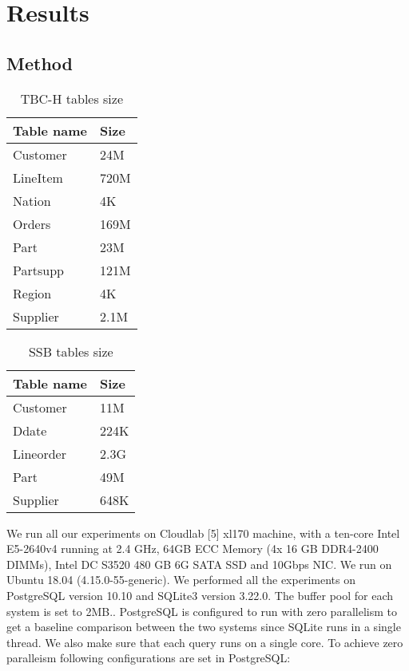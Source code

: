 \section{Results}
\label{sec:results}

\subsection{Method}

\begin{table}[]
\begin{tabular}{|l|l|}
\hline
\textbf{Table name} & \textbf{Size} \\ \hline
Customer & 24M \\ \hline
LineItem & 720M \\ \hline
Nation & 4K \\ \hline
Orders & 169M \\ \hline
Part & 23M \\ \hline
Partsupp & 121M \\ \hline
Region & 4K \\ \hline
Supplier & 2.1M \\ \hline
\end{tabular}
\caption{TBC-H tables size}
\label{tab:tbch_tab}
\end{table}

\begin{table}[]
\begin{tabular}{|l|l|}
\hline
\textbf{Table name} & \textbf{Size} \\ \hline
Customer & 11M \\ \hline
Ddate & 224K \\ \hline
Lineorder & 2.3G \\ \hline
Part & 49M \\ \hline
Supplier & 648K \\ \hline
\end{tabular}
\caption{SSB tables size}
\label{tab:ssb_tab}
\end{table}

We run all our experiments on Cloudlab [5] xl170 machine, with a ten-core Intel E5-2640v4 running at 2.4 GHz, 64GB ECC Memory (4x 16 GB DDR4-2400 DIMMs), Intel DC S3520 480 GB 6G SATA SSD and 10Gbps NIC. We run on Ubuntu 18.04 (4.15.0-55-generic). We performed all the experiments on PostgreSQL version 10.10 and SQLite3 version 3.22.0. The buffer pool for each system is set to 2MB.. PostgreSQL is configured to run with zero parallelism to get a baseline comparison between the two systems since SQLite runs in a single thread. We also make sure that each query runs on a single core. To achieve zero paralleism following configurations are set in PostgreSQL:

